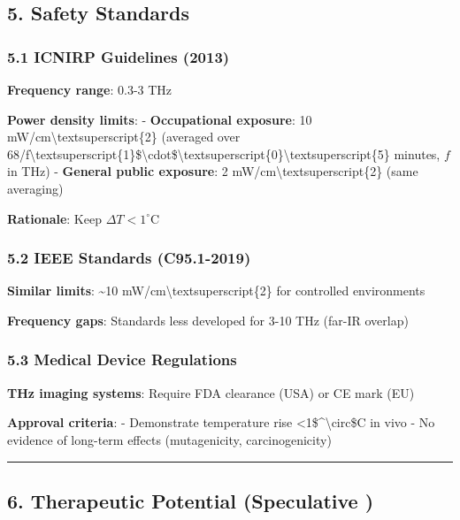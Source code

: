 \subsection{5. Safety Standards}\label{safety-standards}

\subsubsection{5.1 ICNIRP Guidelines
(2013)}\label{icnirp-guidelines-2013}

\textbf{Frequency range}: 0.3-3 THz

\textbf{Power density limits}: - \textbf{Occupational exposure}: 10
mW/cm\textbackslash textsuperscript\{2\} (averaged over
68/f\textbackslash textsuperscript\{1\}\$\textbackslash cdot\$\textbackslash textsuperscript\{0\}\textbackslash textsuperscript\{5\}
minutes, \(f\) in THz) - \textbf{General public exposure}: 2
mW/cm\textbackslash textsuperscript\{2\} (same averaging)

\textbf{Rationale}: Keep \(\Delta T < 1^\circ\)C

\subsubsection{5.2 IEEE Standards
(C95.1-2019)}\label{ieee-standards-c95.1-2019}

\textbf{Similar limits}: \textasciitilde10
mW/cm\textbackslash textsuperscript\{2\} for controlled environments

\textbf{Frequency gaps}: Standards less developed for 3-10 THz (far-IR
overlap)

\subsubsection{5.3 Medical Device
Regulations}\label{medical-device-regulations}

\textbf{THz imaging systems}: Require FDA clearance (USA) or CE mark
(EU)

\textbf{Approval criteria}: - Demonstrate temperature rise
\textless1\$\^{}\textbackslash circ\$C in vivo - No evidence of
long-term effects (mutagenicity, carcinogenicity)

\begin{center}\rule{0.5\linewidth}{0.5pt}\end{center}

\subsection{6. Therapeutic Potential (Speculative
)}\label{therapeutic-potential-speculative}

